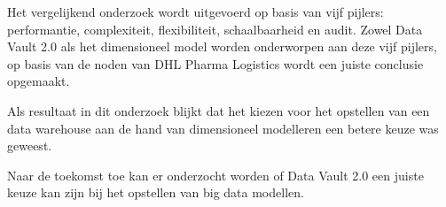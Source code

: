 Het vergelijkend onderzoek wordt uitgevoerd op basis van vijf pijlers: performantie, complexiteit, flexibiliteit, schaalbaarheid en audit. Zowel Data Vault 2.0 als het dimensioneel model worden onderworpen aan deze vijf pijlers, op basis van de noden van DHL Pharma Logistics wordt een juiste conclusie opgemaakt. 

Als resultaat in dit onderzoek blijkt dat het kiezen voor het opstellen van een data warehouse aan de hand van dimensioneel modelleren een betere keuze was geweest.

Naar de toekomst toe kan er onderzocht worden of Data Vault 2.0 een juiste keuze kan zijn bij het opstellen van big data modellen.